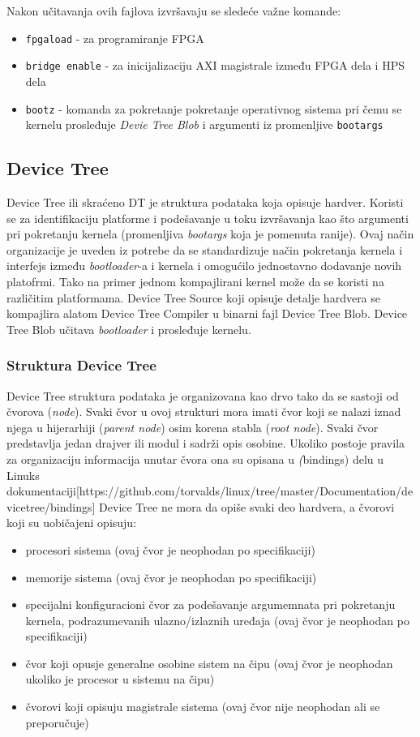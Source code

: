 Nakon učitavanja ovih fajlova izvršavaju se sledeće važne komande:
\begin{itemize}
\item \texttt{fpgaload} - za programiranje FPGA
\item \texttt{bridge enable} - za inicijalizaciju AXI magistrale između FPGA dela i HPS dela
\item \texttt{bootz} - komanda za pokretanje pokretanje operativnog sistema pri čemu se kernelu prosleđuje \textit{Devie Tree Blob} i argumenti iz promenljive \texttt{bootargs}
\end{itemize}

\subsection{Device Tree}
Device Tree ili skraćeno DT je struktura podataka koja opisuje hardver. Koristi se za identifikaciju platforme i podešavanje u toku izvršavanja kao što argumenti pri pokretanju kernela (promenljiva \textit{bootargs} koja je pomenuta ranije). Ovaj način organizacije je uveden iz potrebe da se standardizuje način pokretanja kernela i interfejs između \textit{bootloader}-a i kernela i omogućilo jednostavno dodavanje novih platofrmi. Tako na primer jednom kompajlirani kernel može da se koristi na različitim platformama. Device Tree Source koji opisuje detalje hardvera se kompajlira alatom Device Tree Compiler u binarni fajl Device Tree Blob. Device Tree Blob učitava \textit{bootloader} i prosleđuje kernelu.
\subsubsection{Struktura Device Tree}
Device Tree struktura podataka je organizovana kao drvo tako da se sastoji od čvorova (\textit{node}). Svaki čvor u ovoj strukturi mora imati čvor koji se nalazi iznad njega u hijerarhiji (\textit{parent node}) osim korena stabla (\textit{root node}). Svaki čvor predstavlja jedan drajver ili modul i sadrži opis osobine. Ukoliko postoje pravila za organizaciju informacija unutar čvora ona su opisana u \textit(bindings) delu u Linuks dokumentaciji[https://github.com/torvalds/linux/tree/master/Documentation/devicetree/bindings] Device Tree ne mora da opiše svaki deo hardvera, a čvorovi koji su uobičajeni opisuju:
\begin{itemize}
\item procesori sistema (ovaj čvor je neophodan po specifikaciji)
\item memorije sistema (ovaj čvor je neophodan po specifikaciji)
\item specijalni konfiguracioni čvor za podešavanje argumemnata pri pokretanju kernela, podrazumevanih ulazno/izlaznih uređaja (ovaj čvor je neophodan po specifikaciji)
\item čvor koji opusje generalne osobine sistem na čipu (ovaj čvor je neophodan ukoliko je procesor u sistemu na čipu)
\item čvorovi koji opisuju magistrale sistema (ovaj čvor nije neophodan ali se preporučuje)
\end{itemize}

